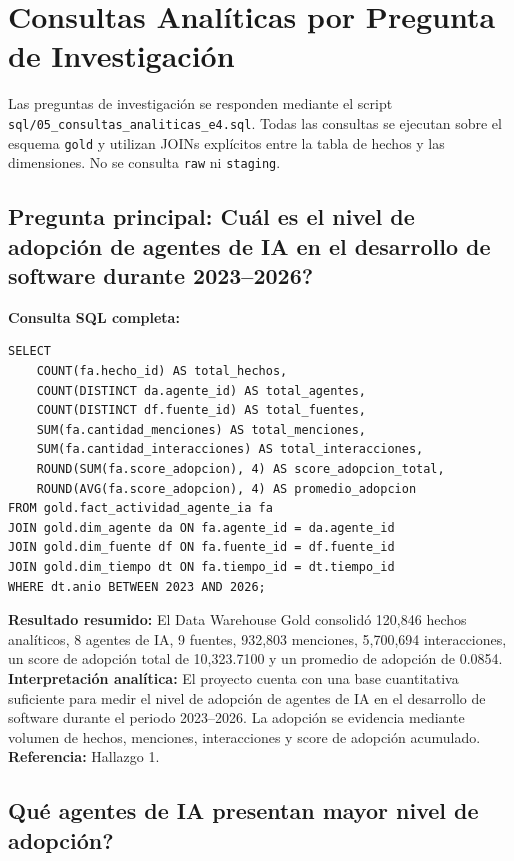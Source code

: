 \documentclass[12pt,a4paper]{article}
\newcommand{\pathcode}[1]{\begingroup\scriptsize\ttfamily\nolinkurl{#1}\endgroup}
\begin{document}
\section{Consultas Anal\'iticas por Pregunta de Investigaci\'on}

Las preguntas de investigaci\'on se responden mediante el script \pathcode{sql/05_consultas_analiticas_e4.sql}. Todas las consultas se ejecutan sobre el esquema \texttt{gold} y utilizan JOINs expl\'icitos entre la tabla de hechos y las dimensiones. No se consulta \texttt{raw} ni \texttt{staging}.

\subsection{Pregunta principal: \textquestiondown Cu\'al es el nivel de adopci\'on de agentes de IA en el desarrollo de software durante 2023--2026?}

\textbf{Consulta SQL completa:}
\begin{verbatim}
SELECT
    COUNT(fa.hecho_id) AS total_hechos,
    COUNT(DISTINCT da.agente_id) AS total_agentes,
    COUNT(DISTINCT df.fuente_id) AS total_fuentes,
    SUM(fa.cantidad_menciones) AS total_menciones,
    SUM(fa.cantidad_interacciones) AS total_interacciones,
    ROUND(SUM(fa.score_adopcion), 4) AS score_adopcion_total,
    ROUND(AVG(fa.score_adopcion), 4) AS promedio_adopcion
FROM gold.fact_actividad_agente_ia fa
JOIN gold.dim_agente da ON fa.agente_id = da.agente_id
JOIN gold.dim_fuente df ON fa.fuente_id = df.fuente_id
JOIN gold.dim_tiempo dt ON fa.tiempo_id = dt.tiempo_id
WHERE dt.anio BETWEEN 2023 AND 2026;
\end{verbatim}
\textbf{Resultado resumido:} El Data Warehouse Gold consolid\'o 120,846 hechos anal\'iticos, 8 agentes de IA, 9 fuentes, 932,803 menciones, 5,700,694 interacciones, un score de adopci\'on total de 10,323.7100 y un promedio de adopci\'on de 0.0854. \\
\textbf{Interpretaci\'on anal\'itica:} El proyecto cuenta con una base cuantitativa suficiente para medir el nivel de adopci\'on de agentes de IA en el desarrollo de software durante el periodo 2023--2026. La adopci\'on se evidencia mediante volumen de hechos, menciones, interacciones y score de adopci\'on acumulado. \\
\textbf{Referencia:} Hallazgo 1.

\subsection{\textquestiondown Qu\'e agentes de IA presentan mayor nivel de adopci\'on?}
\end{document}
